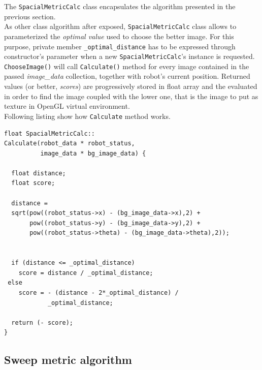The \texttt{SpacialMetricCalc} class encapsulates the 
algorithm presented in the previous section.
\\
As other class algorithm after exposed, \texttt{SpacialMetricCalc}
class allows to parameterized the \textit{optimal value} used to
choose the better image. For this purpose, private member
\texttt{\_optimal\_distance} has to be expressed through constructor's
parameter when a new \texttt{SpacialMetricCalc}'s instance
is requested.
\texttt{ChooseImage()} will call \texttt{Calculate()}
method for every image contained in the passed \textit{image\_data}
collection, together with robot's current position.
Returned values (or better, \textit{scores}) are
progressively stored in float array and the evaluated in order
to find the image coupled with the lower one, that is the image
to put as texture in OpenGL virtual environment.
\\
Following listing show how \texttt{Calculate} method works.
\\
\begin{lstlisting}[caption={\texttt{SpacialMetricCalc::Calculate} method},
    label={code:spacialmetriccalc:calculate}]
float SpacialMetricCalc::
Calculate(robot_data * robot_status,
          image_data * bg_image_data) {

  float distance;
  float score;

  distance = 
  sqrt(pow((robot_status->x) - (bg_image_data->x),2) +
       pow((robot_status->y) - (bg_image_data->y),2) +
       pow((robot_status->theta) - (bg_image_data->theta),2));


  if (distance <= _optimal_distance)
    score = distance / _optimal_distance;
 else
    score = - (distance - 2*_optimal_distance) /
            _optimal_distance;

  return (- score);
}
\end{lstlisting}


\subsection{Sweep metric algorithm}
\label{concr:iimageselector:sweep_metric_algorithm}

